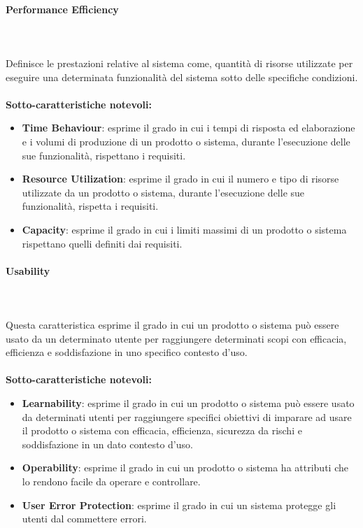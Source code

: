 \paragraph{Performance Efficiency} ~\\ ~\\
Definisce le prestazioni relative al sistema come, quantità di risorse utilizzate per eseguire una determinata funzionalità del sistema sotto delle specifiche condizioni. \\ \\
\textbf{Sotto-caratteristiche notevoli:}
\begin{itemize}
	\item{\textbf{Time Behaviour}}: esprime il grado in cui i tempi di risposta ed elaborazione e i volumi di produzione di un prodotto o sistema, durante l'esecuzione delle sue funzionalità, rispettano i requisiti.
	\item{\textbf{Resource Utilization}}: esprime il grado in cui il numero e tipo di risorse utilizzate da un prodotto o sistema, durante l'esecuzione delle sue funzionalità, rispetta i requisiti.
	\item{\textbf{Capacity}}: esprime il grado in cui i limiti massimi di un prodotto o sistema rispettano quelli definiti dai requisiti.
\end{itemize}

\paragraph{Usability} ~\\ ~\\
Questa caratteristica esprime il grado in cui un prodotto o sistema può essere usato da un determinato utente per raggiungere determinati scopi con efficacia, efficienza e soddisfazione in uno specifico contesto d'uso.\\ \\
\textbf{Sotto-caratteristiche notevoli:}
\begin{itemize}
	\item{\textbf{Learnability}}: esprime il grado in cui un prodotto o sistema può essere usato da determinati utenti per raggiungere specifici obiettivi di imparare ad usare il prodotto o sistema con efficacia, efficienza, sicurezza da rischi e soddisfazione in un dato contesto d'uso.
	\item{\textbf{Operability}}: esprime il grado in cui un prodotto o sistema ha attributi che lo rendono facile da operare e controllare.
	\item{\textbf{User Error Protection}}: esprime il grado in cui un sistema protegge gli utenti dal commettere errori.
\end{itemize}

